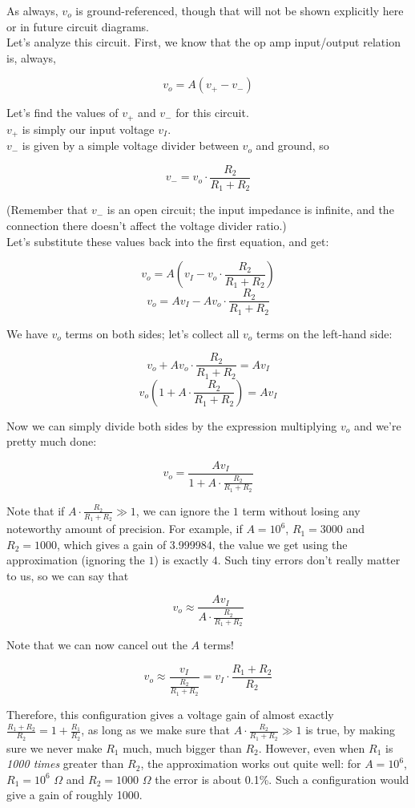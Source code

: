 \documentclass[12pt,a4paper]{report}
\begin{document}
As always, $v_o$ is ground-referenced, though that will not be shown explicitly here or in future circuit diagrams.\\
Let's analyze this circuit. First, we know that the op amp input/output relation is, always,

\[ v_o = A(v_+ - v_-) \]

Let's find the values of $v_+$ and $v_-$ for this circuit.\\
$v_+$ is simply our input voltage $v_I$.\\
$v_-$ is given by a simple voltage divider between $v_o$ and ground, so

\[ v_- = v_o \cdot \frac{R_2}{R_1 + R_2} \]

(Remember that $v_-$ is an open circuit; the input impedance is infinite, and the connection there doesn't affect the voltage divider ratio.)\\

Let's substitute these values back into the first equation, and get:

\[ v_o = A(v_I - v_o \cdot \frac{R_2}{R_1 + R_2}) \]
\[ v_o = Av_I - A v_o \cdot \frac{R_2}{R_1 + R_2} \]

We have $v_o$ terms on both sides; let's collect all $v_o$ terms on the left-hand side:

\[ v_o + A v_o \cdot \frac{R_2}{R_1 + R_2} = A v_I  \]
\[ v_o(1 + A \cdot \frac{R_2}{R_1 + R_2}) = A v_I \]

Now we can simply divide both sides by the expression multiplying $v_o$ and we're pretty much done:

\[ v_o = \frac{A v_I}{1 + A \cdot \frac{R_2}{R_1 + R_2}} \]

Note that if $\displaystyle A \cdot \frac{R_2}{R_1 + R_2} \gg 1$, we can ignore the $1$ term without losing any noteworthy amount of precision. For example, if $A = 10^6$, $R_1 = 3000$ and $R_2 = 1000$, which gives a gain of 3.999984, the value we get using the approximation (ignoring the $1$) is exactly $4$. Such tiny errors don't really matter to us, so we can say that

\[ v_o \approx \frac{A v_I}{A \cdot \frac{R_2}{R_1 + R_2}} \]

Note that we can now cancel out the $A$ terms!

\[ v_o \approx \frac{v_I}{\frac{R_2}{R_1 + R_2}} = v_I \cdot \frac{R_1 + R_2}{R_2} \]

Therefore, this configuration gives a voltage gain of almost exactly $\displaystyle \frac{R_1 + R_2}{R_2} = 1 + \frac{R_1}{R_2}$, as long as we make sure that $\displaystyle A \cdot \frac{R_2}{R_1 + R_2} \gg 1$ is true, by making sure we never make $R_1$ much, much bigger than $R_2$. However, even when $R_1$ is \emph{1000 times} greater than $R_2$, the approximation works out quite well: for $A = 10^6$, $R_1 = 10^6$ $\Omega$ and $R_2 = 1000$ $\Omega$ the error is about 0.1\%. Such a configuration would give a gain of roughly 1000.\\
\end{document}
